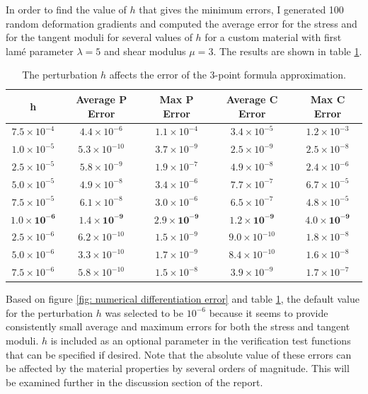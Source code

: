 \documentclass[]{spie}  %
\newcommand\Tstrut{\rule{0pt}{2.6ex}}         %
\begin{document}
In order to find the value of $h$ that gives the minimum errors, I generated 100 random deformation gradients and computed the average error for the stress and for the tangent moduli for several values of $h$ for a custom material with first lam\'e parameter $\lambda = 5$ and shear modulus $\mu = 3$. The results are shown in table \ref{table: h vs. error}.

\begin{table}[h]
	\centering
	\caption{The perturbation $h$ affects the error of the 3-point formula approximation.}
	\begin{tabular}{ | c | c | c | c | c | }
		\hline
		h & Average P Error & Max P Error & Average C Error & Max C Error \Tstrut \\ \hline
		$7.5 \times 10^{-4}$ & $4.4 \times 10^{-6}$  & $1.1 \times 10^{-4}$ & $3.4 \times 10^{-5}$ & $1.2 \times 10^{-3}$ \Tstrut \\
		$1.0 \times 10^{-5}$ & $5.3 \times 10^{-10}$ & $3.7 \times 10^{-9}$ & $2.5 \times 10^{-9}$ & $2.5 \times 10^{-8}$ \\
		$2.5 \times 10^{-5}$ & $5.8 \times 10^{-9}$  & $1.9 \times 10^{-7}$ & $4.9 \times 10^{-8}$ & $2.4 \times 10^{-6}$ \\
		$5.0 \times 10^{-5}$ & $4.9 \times 10^{-8}$  & $3.4 \times 10^{-6}$ & $7.7 \times 10^{-7}$ & $6.7 \times 10^{-5}$ \\
		$7.5 \times 10^{-5}$ & $6.1 \times 10^{-8}$  & $3.0 \times 10^{-6}$ & $6.5 \times 10^{-7}$ & $4.8 \times 10^{-5}$ \\
		$\bm{1.0 \times 10^{-6}}$ & $\bm{1.4 \times 10^{-9}}$  & $\bm{2.9 \times 10^{-9}}$ & $\bm{1.2 \times 10^{-9}}$ & $\bm{4.0 \times 10^{-9}}$ \\
		$2.5 \times 10^{-6}$ & $6.2 \times 10^{-10}$ & $1.5 \times 10^{-9}$ & $9.0 \times 10^{-10}$& $1.8 \times 10^{-8}$ \\
		$5.0 \times 10^{-6}$ & $3.3 \times 10^{-10}$ & $1.7 \times 10^{-9}$ & $8.4 \times 10^{-10}$& $1.6 \times 10^{-8}$ \\
		$7.5 \times 10^{-6}$ & $5.8 \times 10^{-10}$ & $1.5 \times 10^{-8}$ & $3.9 \times 10^{-9}$ & $1.7 \times 10^{-7}$ \\
		\hline
	\end{tabular}
\label{table: h vs. error}
\end{table}

Based on figure \ref{fig: numerical differentiation error} and table \ref{table: h vs. error}, the default value for the perturbation $h$ was selected to be $10^{-6}$ because it seems to provide consistently small average and maximum errors for both the stress and tangent moduli. $h$ is included as an optional parameter in the verification test functions that can be specified if desired. Note that the absolute value of these errors can be affected by the material properties by several orders of magnitude. This will be examined further in the discussion section of the report.
\end{document}
